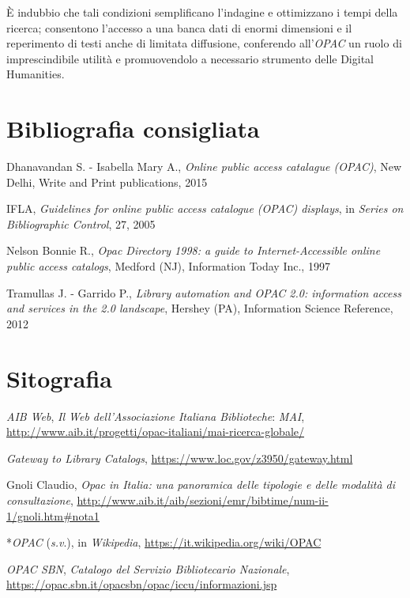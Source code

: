 \documentclass[
  b5paper,
  twoside,
  12pt,
  chapterprefix=false,
  bibliography=totocnumbered,
  parskip=false]{scrbook}
\begin{document}
È indubbio che tali condizioni semplificano l'indagine e ottimizzano i
tempi della ricerca; consentono l'accesso a una banca dati di enormi
dimensioni e il reperimento di testi anche di limitata diffusione,
conferendo all'\emph{OPAC} un ruolo di imprescindibile utilità e
promuovendolo a necessario strumento delle Digital Humanities.

\hypertarget{bibliografia-consigliata-18}{%
\section*{Bibliografia consigliata}\label{bibliografia-consigliata-18}}

Dhanavandan S. - Isabella Mary A., \emph{Online public access catalague
(OPAC)}, New Delhi, Write and Print publications, 2015

IFLA, \emph{Guidelines for online public access catalogue (OPAC) displays},
in \emph{Series on Bibliographic Control}, 27, 2005

Nelson Bonnie R., \emph{Opac Directory 1998: a guide to Internet-Accessible
online public access catalogs}, Medford (NJ), Information Today Inc.,
1997

Tramullas J. - Garrido P., \emph{Library automation and OPAC 2.0: information
access and services in the 2.0 landscape}, Hershey (PA), Information
Science Reference, 2012

\hypertarget{sitografia-25}{%
\section*{Sitografia}\label{sitografia-25}}

\emph{AIB Web}, \emph{Il Web dell'Associazione Italiana Biblioteche}: \emph{MAI},
\url{http://www.aib.it/progetti/opac-italiani/mai-ricerca-globale/}

\emph{Gateway to Library Catalogs},
\url{https://www.loc.gov/z3950/gateway.html}

Gnoli Claudio, \emph{Opac in Italia: una panoramica delle tipologie e delle
modalità di consultazione},
\url{http://www.aib.it/aib/sezioni/emr/bibtime/num-ii-1/gnoli.htm\#nota1}

*\emph{OPAC} (\emph{s.v}.), in \emph{Wikipedia},
\url{https://it.wikipedia.org/wiki/OPAC}

\emph{OPAC SBN}, \emph{Catalogo del Servizio Bibliotecario Nazionale},
\url{https://opac.sbn.it/opacsbn/opac/iccu/informazioni.jsp}
\end{document}
